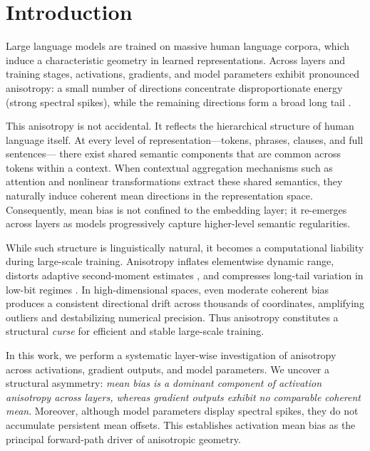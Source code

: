 \section{Introduction}

Large language models are trained on massive human language corpora,
which induce a characteristic geometry in learned representations.
Across layers and training stages, activations, gradients, and model parameters
exhibit pronounced anisotropy:
a small number of directions concentrate disproportionate energy
(strong spectral spikes),
while the remaining directions form a broad long tail
\cite{ethayarajh2019contextual,mu2018all,timkey2021rogue,kovaleva2021bertbusters,machina2024anisotropy}.

This anisotropy is not accidental.
It reflects the hierarchical structure of human language itself.
At every level of representation—tokens, phrases, clauses, and full sentences—
there exist shared semantic components that are common across tokens within a context.
When contextual aggregation mechanisms such as attention and nonlinear transformations
extract these shared semantics, they naturally induce coherent mean directions
in the representation space.
Consequently, mean bias is not confined to the embedding layer;
it re-emerges across layers as models progressively capture higher-level
semantic regularities.

While such structure is linguistically natural,
it becomes a computational liability during large-scale training.
Anisotropy inflates elementwise dynamic range,
distorts adaptive second-moment estimates
\cite{kingma2014adam,loshchilov2017adamw,spectra2026},
and compresses long-tail variation in low-bit regimes
\cite{xiao2023smoothquant,frantar2022gptq,lin2024awq,li2024svdquant,ashkboos2024quarot}.
In high-dimensional spaces, even moderate coherent bias produces
a consistent directional drift across thousands of coordinates,
amplifying outliers and destabilizing numerical precision.
Thus anisotropy constitutes a structural \emph{curse}
for efficient and stable large-scale training.

In this work, we perform a systematic layer-wise investigation
of anisotropy across activations, gradient outputs, and model parameters.
We uncover a structural asymmetry:
\emph{mean bias is a dominant component of activation anisotropy across layers,
whereas gradient outputs exhibit no comparable coherent mean}.
Moreover, although model parameters display spectral spikes,
they do not accumulate persistent mean offsets.
This establishes activation mean bias as the principal forward-path driver
of anisotropic geometry.

